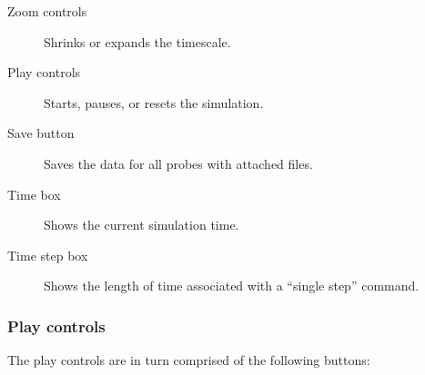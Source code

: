 \documentclass{article}
\begin{document}
\begin{description}

\item[Zoom controls]\mbox{}

Shrinks or expands the timescale.

\item[Play controls]\mbox{}

Starts, pauses, or resets the simulation.

\item[Save button]\mbox{}

Saves the data for all probes with attached files.

\item[Time box]\mbox{}

Shows the current simulation time.

\item[Time step box]\mbox{}

Shows the length of time associated with a ``single step'' command.

\end{description}

\subsubsection{Play controls}
\label{TimelinePlayControls}

The play controls are in turn comprised of the following buttons:
\end{document}
